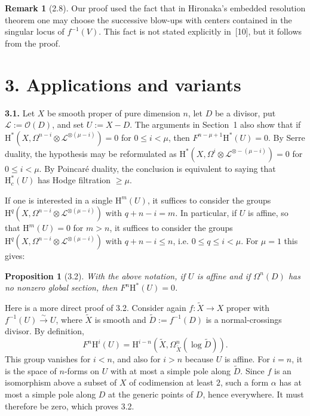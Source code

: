 \documentclass[11pt]{amsart}
\newtheorem{proposition}[theorem]{Proposition}
\theoremstyle{definition}
\newtheorem{remark}[theorem]{Remark}
\begin{document}
\begin{remark}[2.8]
Our proof used the fact that in Hironaka's embedded resolution theorem one may choose the successive blow-ups with centers contained in the singular locus of $f^{-1}(V)$. This fact is not stated explicitly in~[10], but it follows from the proof.
\end{remark}

\section*{3. Applications and variants}

\noindent\textbf{3.1.} Let $X$ be smooth proper of pure dimension $n$, let $D$ be a divisor, put $\mathscr L:=\mathscr O(D)$, and set $U:=X-D$. The arguments in Section~1 also show that if $\mathrm H^*(X,\Omega^{n-i}\otimes \mathscr L^{\otimes(\mu-i)})=0$ for $0\le i<\mu$, then $F^{n-\mu+1}\mathrm H^*(U)=0$. By Serre duality, the hypothesis may be reformulated as $\mathrm H^*(X,\Omega^i\otimes \mathscr L^{\otimes-(\mu-i)})=0$ for $0\le i<\mu$. By Poincar\'e duality, the conclusion is equivalent to saying that $\mathrm H_c^*(U)$ has Hodge filtration $\ge \mu$.

If one is interested in a single $\mathrm H^m(U)$, it suffices to consider the groups $\mathrm H^q(X,\Omega^{n-i}\otimes \mathscr L^{\otimes(\mu-i)})$ with $q+n-i=m$. In particular, if $U$ is affine, so that $\mathrm H^m(U)=0$ for $m>n$, it suffices to consider the groups $\mathrm H^q(X,\Omega^{n-i}\otimes \mathscr L^{\otimes(\mu-i)})$ with $q+n-i\le n$, i.e. $0\le q\le i<\mu$. For $\mu=1$ this gives:

\begin{proposition}[3.2]
With the above notation, if $U$ is affine and if $\Omega^n(D)$ has no nonzero global section, then $F^n\mathrm H^*(U)=0$.
\end{proposition}

Here is a more direct proof of 3.2. Consider again $f:\widetilde X\to X$ proper with $f^{-1}(U)\xrightarrow{\sim}U$, where $\widetilde X$ is smooth and $\widetilde D:=f^{-1}(D)$ is a normal-crossings divisor. By definition,
\[
F^n\mathrm H^i(U)=\mathrm H^{i-n}(\widetilde X, \Omega_{\widetilde X}^n(\log \widetilde D)).
\]
This group vanishes for $i<n$, and also for $i>n$ because $U$ is affine. For $i=n$, it is the space of $n$-forms on $U$ with at most a simple pole along $\widetilde D$. Since $f$ is an isomorphism above a subset of $X$ of codimension at least $2$, such a form $\alpha$ has at most a simple pole along $D$ at the generic points of $D$, hence everywhere. It must therefore be zero, which proves 3.2.
\end{document}
